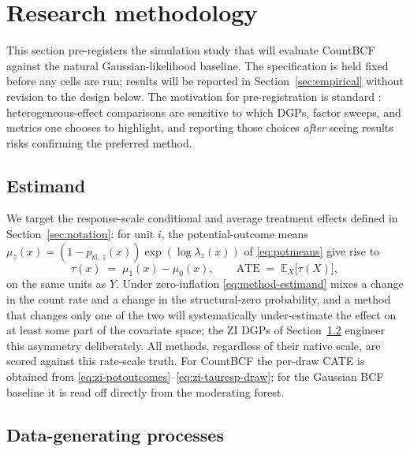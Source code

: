 \documentclass[11pt]{article}
\theoremstyle{plain}
\theoremstyle{definition}
\theoremstyle{remark}
\newcommand{\E}{\mathbb{E}}
\newcommand{\muz}{\mu_{z}}
\newcommand{\muone}{\mu_{1}}
\newcommand{\muzero}{\mu_{0}}
\newcommand{\tauresp}{\tau}                 %
\newcommand{\pzi}[1][z]{p_{\mathrm{zi},\,#1}}
\begin{document}
\section{Research methodology}\label{sec:methodology}

This section pre-registers the simulation study that will evaluate
CountBCF against the natural Gaussian-likelihood baseline. The
specification is held fixed before any cells are run; results will be
reported in Section~\ref{sec:empirical} without revision to the
design below. The motivation for pre-registration is standard
\citep[\S~3.2]{hahn2020bayesian}: heterogeneous-effect comparisons
are sensitive to which DGPs, factor sweeps, and metrics one chooses
to highlight, and reporting those choices \emph{after} seeing results
risks confirming the preferred method.

\subsection{Estimand}\label{sec:method-estimand}

We target the response-scale conditional and average treatment
effects defined in Section~\ref{sec:notation}: for unit $i$, the
potential-outcome means
$\muz(x) = (1 - \pzi(x)) \exp(\log\lambda_z(x))$ of
\eqref{eq:potmeans} give rise to
\begin{equation}
  \tauresp(x) \;=\; \muone(x) - \muzero(x),
  \qquad
  \mathrm{ATE} \;=\; \E_{X}\!\bigl[\tauresp(X)\bigr],
  \label{eq:method-estimand}
\end{equation}
on the same units as $Y$. Under zero-inflation \eqref{eq:method-estimand}
mixes a change in the count rate and a change in the structural-zero
probability, and a method that changes only one of the two will
systematically under-estimate the effect on at least some part of the
covariate space; the ZI DGPs of Section~\ref{sec:method-dgp}
engineer this asymmetry deliberately. All methods, regardless of
their native scale, are scored against this rate-scale truth. For
CountBCF the per-draw CATE is obtained from
\eqref{eq:zi-potoutcomes}--\eqref{eq:zi-tauresp-draw}; for the
Gaussian BCF baseline it is read off directly from the moderating
forest.

\subsection{Data-generating processes}\label{sec:method-dgp}
\end{document}
